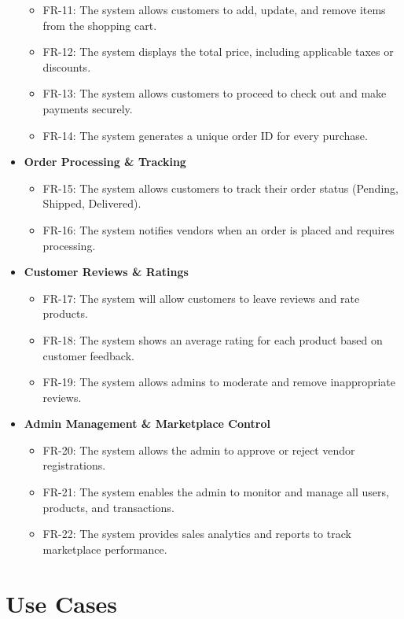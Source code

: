 \begin{itemize}
    \begin{itemize}
        \item FR-11: The system allows customers to add, update, and remove items from the shopping cart.
        \item FR-12: The system displays the total price, including applicable taxes or discounts.
        \item FR-13: The system allows customers to proceed to check out and make payments securely.
        \item FR-14: The system generates a unique order ID for every purchase.
    \end{itemize}
    \item \textbf{Order Processing \& Tracking}
    \begin{itemize}
        \item FR-15: The system allows customers to track their order status (Pending, Shipped, Delivered).
        \item FR-16: The system notifies vendors when an order is placed and requires processing.
    \end{itemize}
    \item \textbf{Customer Reviews \& Ratings}
    \begin{itemize}
        \item FR-17: The system will allow customers to leave reviews and rate products.
        \item FR-18: The system shows an average rating for each product based on customer feedback.
        \item FR-19: The system allows admins to moderate and remove inappropriate reviews.
    \end{itemize}
    \item \textbf{Admin Management \& Marketplace Control}
    \begin{itemize}
        \item FR-20: The system allows the admin to approve or reject vendor registrations.
        \item FR-21: The system enables the admin to monitor and manage all users, products, and transactions.
        \item FR-22: The system provides sales analytics and reports to track marketplace performance.
    \end{itemize}
\end{itemize}

\clearpage
\section{Use Cases}

